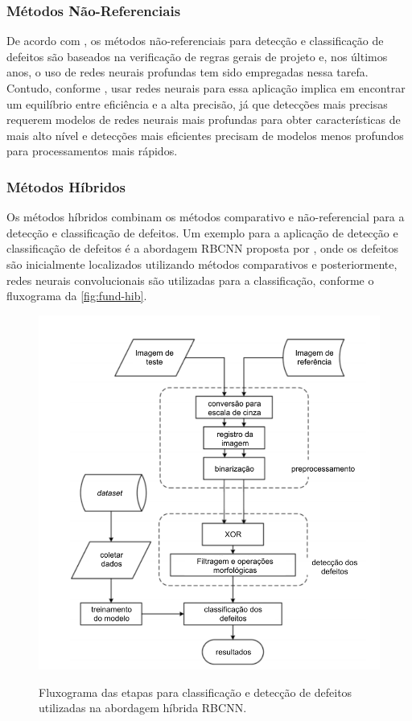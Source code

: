 \subsubsection{Métodos Não-Referenciais} \label{cap:fund-pcb-metodos-nref}
De acordo com , os métodos não-referenciais para detecção e classificação de defeitos são baseados na verificação de regras gerais de projeto e, nos últimos anos, o uso de redes neurais profundas tem sido empregadas nessa tarefa. Contudo, conforme , usar redes neurais para essa aplicação implica em encontrar um equilíbrio entre eficiência e a alta precisão, já que detecções mais precisas requerem modelos de redes neurais mais profundas para obter características de mais alto nível e detecções mais eficientes precisam de modelos menos profundos para processamentos mais rápidos.

\subsubsection{Métodos Híbridos} \label{cap:fund-pcb-metodos-hib}
Os métodos híbridos combinam os métodos comparativo e não-referencial para a detecção e classificação de defeitos. Um exemplo para a aplicação de detecção e classificação de defeitos é a abordagem RBCNN proposta por , onde os defeitos são inicialmente localizados utilizando métodos comparativos e posteriormente, redes neurais convolucionais são utilizadas para a classificação, conforme o fluxograma da \autoref{fig:fund-hib}.

\begin{figure}[h!] %
  \centering
  \caption{Fluxograma das etapas para classificação e detecção de defeitos utilizadas na abordagem híbrida RBCNN.}
  \includegraphics[scale=0.85]{img/img-fundamentacao-hib.pdf}
  \label{fig:fund-hib}
\end{figure}

